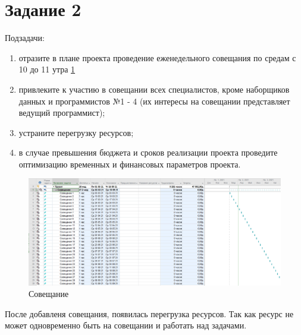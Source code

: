 \section{Задание 2}
Подзадачи:
\begin{enumerate}
	\item отразите в плане проекта проведение еженедельного совещания по
	средам с 10 до 11 утра \ref{fig:lab321}
	\item привлеките к участию в совещании всех специалистов, кроме
	наборщиков данных и программистов №1 - 4 (их интересы на совещании
	представляет ведущий программист);
	\item устраните перегрузку ресурсов;
	\item в случае превышения бюджета и сроков реализации проекта проведите
	оптимизацию временных и финансовых параметров проекта.
\end{enumerate}

\begin{figure}[h]
	\centering
	\includegraphics[width=0.7\linewidth]{src/lab3_2_1}
	\caption{Совещание}
	\label{fig:lab321}
\end{figure}

После добавленя совещания, появилась перегрузка ресурсов.
Так как ресурс не может одновременно быть на совещании и работать над задачами.











